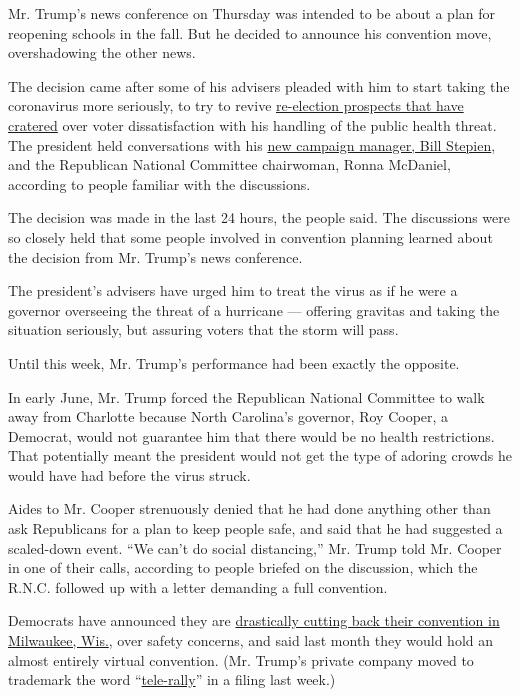 Mr. Trump's news conference on Thursday was intended to be about a plan
for reopening schools in the fall. But he decided to announce his
convention move, overshadowing the other news.

The decision came after some of his advisers pleaded with him to start
taking the coronavirus more seriously, to try to revive
\href{https://www.nytimes.com/2020/06/24/us/politics/trump-biden-poll-nyt-upshot-siena-college.html}{re-election
prospects that have cratered} over voter dissatisfaction with his
handling of the public health threat. The president held conversations
with his \href{https://www.nytimes.com/article/bill-stepien.html}{new
campaign manager, Bill Stepien}, and the Republican National Committee
chairwoman, Ronna McDaniel, according to people familiar with the
discussions.

The decision was made in the last 24 hours, the people said. The
discussions were so closely held that some people involved in convention
planning learned about the decision from Mr. Trump's news conference.

The president's advisers have urged him to treat the virus as if he were
a governor overseeing the threat of a hurricane --- offering gravitas
and taking the situation seriously, but assuring voters that the storm
will pass.

Until this week, Mr. Trump's performance had been exactly the opposite.

In early June, Mr. Trump forced the Republican National Committee to
walk away from Charlotte because North Carolina's governor, Roy Cooper,
a Democrat, would not guarantee him that there would be no health
restrictions. That potentially meant the president would not get the
type of adoring crowds he would have had before the virus struck.

Aides to Mr. Cooper strenuously denied that he had done anything other
than ask Republicans for a plan to keep people safe, and said that he
had suggested a scaled-down event. ``We can't do social distancing,''
Mr. Trump told Mr. Cooper in one of their calls, according to people
briefed on the discussion, which the R.N.C. followed up with a letter
demanding a full convention.

Democrats have announced they are
\href{https://www.nytimes.com/2020/07/17/us/politics/democratic-convention-milwaukee.html}{drastically
cutting back their convention in Milwaukee, Wis.}, over safety concerns,
and said last month they would hold an almost entirely virtual
convention. (Mr. Trump's private company moved to trademark the word
``\href{https://www.washingtonpost.com/politics/trumps-company-applied-to-trademark-telerally-then-president-trump-held-a-tele-rally/2020/07/22/0adca60e-cb7f-11ea-bc6a-6841b28d9093_story.html}{tele-rally}''
in a filing last week.)

